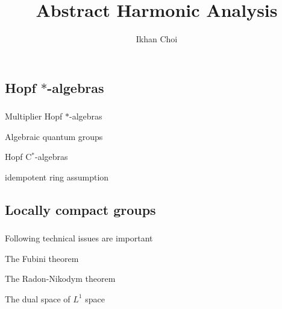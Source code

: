 \documentclass{../../large}
\begin{document}
\title{Abstract Harmonic Analysis}
\author{Ikhan Choi}
\maketitle
\tableofcontents



\part{}

\chapter{Hopf $*$-algebras}
\section{}
Multiplier Hopf $*$-algebras

Algebraic quantum groups

Hopf C$^*$-algebras

idempotent ring assumption


\chapter{Locally compact groups}


\section{}

\begin{prb}
Following technical issues are important
\begin{parts}
\item The Fubini theorem
\item The Radon-Nikodym theorem
\item The dual space of $L^1$ space
\end{parts}
\end{prb}

\begin{prb}
\end{prb}

\begin{prb}
\end{prb}

\begin{prb}
\end{prb}
\end{document}
